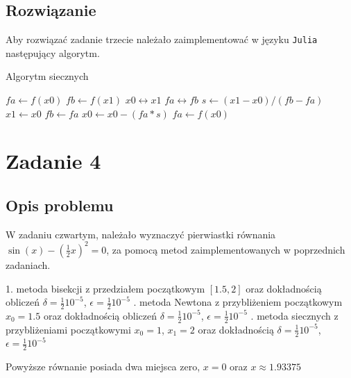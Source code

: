 \documentclass{article}
\begin{document}
\begin{center}
    \subsection{Rozwiązanie}
    \large Aby rozwiązać zadanie trzecie należało zaimplementować w języku \texttt{Julia} następujący algorytm. 
    \begin{flushleft}
        \begin{algorithm}
            \caption{Algorytm siecznych}\label{alg:siecznych}
            \begin{algorithmic}
                \State $fa \gets f(x0)$
                \State $fb \gets f(x1)$
                    \State$x0 \leftrightarrow x1$
                    \State$fa \leftrightarrow fb$
                    \EndIf
                    \State$s \gets (x1 - x0)/(fb - fa)$
                    \State$x1 \gets x0$
                    \State$fb \gets fa$
                    \State$x0 \gets x0 - (fa * s)$
                    \State$fa \gets f(x0)$
                    \EndIf
                \EndFor \newline
                \EndFunction
            \end{algorithmic}
        \end{algorithm}
    \end{flushleft}
    
    \section{Zadanie 4}
    \subsection{Opis problemu}
    \large W zadaniu czwartym, należało wyznaczyć pierwiastki równania \(\sin(x) - (\frac{1}{2}x)^2 = 0\),
     za pomocą metod zaimplementowanych w poprzednich zadaniach.\newline
     \newline
     \begin{flushleft}
        1. metoda bisekcji z przedziałem początkowym \([1.5,2]\) oraz dokładnością obliczeń \(\delta = \frac{1}{2}10^{-5}\), \(\epsilon = \frac{1}{2}10^{-5}\) . metoda Newtona z przybliżeniem początkowym \(x_{0} = 1.5\) oraz dokładnością obliczeń \(\delta = \frac{1}{2}10^{-5}\), \(\epsilon = \frac{1}{2}10^{-5}\) . metoda siecznych z przybliżeniami początkowymi \(x_{0} = 1\), \(x_{1} = 2\) oraz dokładnością \(\delta = \frac{1}{2}10^{-5}\), \(\epsilon = \frac{1}{2}10^{-5}\)
     \end{flushleft}
     Powyższe równanie posiada dwa miejsca zero, \(x=0\) oraz \(x \approx 1.93375\) 

\end{center}
\end{document}
